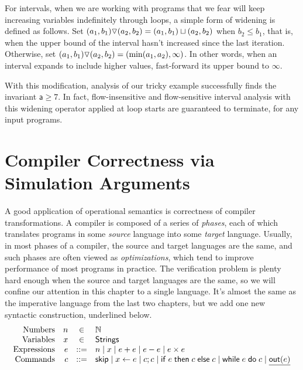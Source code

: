\documentclass{amsbook}
\theoremstyle{definition}
\theoremstyle{remark}
\numberwithin{section}{chapter}
\numberwithin{equation}{chapter}
\begin{document}
For intervals, when we are working with programs that we fear will keep increasing variables indefinitely through loops, a simple form of widening is defined as follows.
Set $(a_1, b_1) \triangledown (a_2, b_2) = (a_1, b_1) \sqcup (a_2, b_2)$ when $b_2 \leq b_1$, that is, when the upper bound of the interval hasn't increased since the last iteration.
Otherwise, set $(a_1, b_1) \triangledown (a_2, b_2) = (\min(a_1, a_2), \infty)$.
In other words, when an interval expands to include higher values, fast-forward its upper bound to $\infty$.

With this modification, analysis of our tricky example successfully finds the invariant $\mathsf{a} \geq 7$.
In fact, flow-insensitive and flow-sensitive interval analysis with this widening operator applied at loop starts are guaranteed to terminate, for any input programs.



\chapter{\label{compiler_correctness}Compiler Correctness via Simulation Arguments}

\newcommand{\outp}[1]{\mathsf{out}(#1)}

A good application of operational semantics is correctness of compiler transformations.
A compiler is composed of a series of \emph{phases}, each of which translates programs in some \emph{source} language into some \emph{target} language.
Usually, in most phases of a compiler, the source and target languages are the same, and such phases are often viewed as \emph{optimizations}, which tend to improve performance of most programs in practice.
The verification problem is plenty hard enough when the source and target languages are the same, so we will confine our attention in this chapter to a single language.
It's almost the same as the imperative language from the last two chapters, but we add one new syntactic construction, underlined below.
$$\begin{array}{rrcl}
  \textrm{Numbers} & n &\in& \mathbb N \\
  \textrm{Variables} & x &\in& \mathsf{Strings} \\
  \textrm{Expressions} & e &::=& n \mid x \mid e + e \mid e - e \mid e \times e \\
  \textrm{Commands} & c &::=& \skipe \mid \assign{x}{e} \mid c; c \mid \ifte{e}{c}{c} \mid \while{e}{c} \mid \underline{\outp{e}}
\end{array}$$
\end{document}
